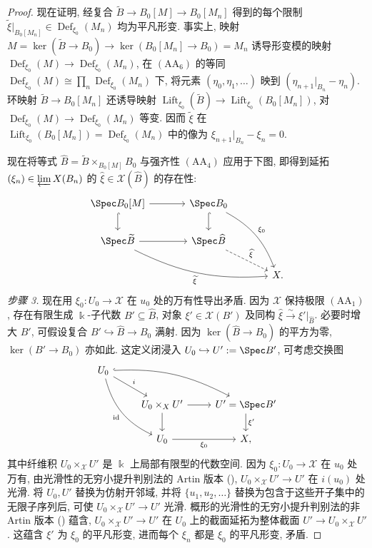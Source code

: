 \begin{proof}
现在证明, 经复合 $\widetilde B\to B_0[M]\to B_0[M_n]$ 得到的每个限制 $\widetilde\xi|_{B_0[M_n]}\in\operatorname{Def}_{\xi_0}(M_n)$ 均为平凡形变. 事实上, 映射 $M=\ker(\widetilde B\to B_0)\to\ker(B_0[M_n]\to B_0)=M_n$ 诱导形变模的映射 $\operatorname{Def}_{\xi_0}(M)\to\operatorname{Def}_{\xi_0}(M_n)$, 在 $(\mathrm{AA}_6)$ 的等同 $\operatorname{Def}_{\xi_0}(M)\cong\prod_n\operatorname{Def}_{\xi_0}(M_n)$ 下, 将元素 $(\eta_0,\eta_1,\ldots)$ 映到 $(\eta_{n+1}|_{B_n}-\eta_n)$. 环映射 $\widetilde B\to B_0[M_n]$ 还诱导映射 $\operatorname{Lift}_{\xi_0}(\widetilde B)\to\operatorname{Lift}_{\xi_0}(B_0[M_n])$, 对 $\operatorname{Def}_{\xi_0}(M)\to\operatorname{Def}_{\xi_0}(M_n)$ 等变. 因而 $\widetilde\xi$ 在 $\operatorname{Lift}_{\xi_0}(B_0[M_n])=\operatorname{Def}_{\xi_0}(M_n)$ 中的像为 $\xi_{n+1}|_{B_n}-\xi_n=0$.

现在将等式 $\widehat B=\widetilde B\times_{B_0[M]}B_0$ 与强齐性 $(\mathrm{AA}_4)$ 应用于下图, 即得到延拓 $(\xi_n)\in\varprojlim\mathcal X(B_n)$ 的 $\widehat\xi\in\mathcal X(\widehat B)$ 的存在性:
\[
\begin{tikzcd}[column sep=large]
\Spec B_0[M]\arrow[r]\arrow[d,hook]&\Spec B_0\arrow[d,hook]\arrow[ddr,bend left=20,"\xi_0"]&\\
\Spec\widetilde B\arrow[r]\arrow[drr,bend right=15,"\widetilde\xi"']&\Spec\widehat B\arrow[dr,dashed,"\widehat\xi"]&\\
&&\mathcal X.
\end{tikzcd}
\]
\textit{步骤 3.} 现在用 $\xi_0:U_0\to\mathcal X$ 在 $u_0$ 处的万有性导出矛盾. 因为 $\mathcal X$ 保持极限 $(\mathrm{AA}_1)$, 存在有限生成 $\Bbbk$-子代数 $B'\subseteq\widehat B$, 对象 $\xi'\in\mathcal X(B')$ 及同构 $\widehat\xi\xrightarrow\sim\xi'|_{\widehat B}$. 必要时增大 $B'$, 可假设复合 $B'\hookrightarrow\widehat B\to B_0$ 满射. 因为 $\ker(\widehat B\to B_0)$ 的平方为零, $\ker(B'\to B_0)$ 亦如此. 这定义闭浸入 $U_0\hookrightarrow U':=\Spec B'$, 可考虑交换图
\[
\begin{tikzcd}
U_0\arrow[dr,"i"]\arrow[drr,hook,bend left=15]\arrow[ddr,bend right=25,"\mathrm{id}"']&&\\
&U_0\times_{\mathcal X}U'\arrow[r]\arrow[d]&U'=\Spec B'\arrow[d,"\xi'"]\\
&U_0\arrow[r,"\xi_0"']&\mathcal X,
\end{tikzcd}
\]
其中纤维积 $U_0\times_{\mathcal X}U'$ 是 $\Bbbk$ 上局部有限型的代数空间. 因为 $\xi_0:U_0\to\mathcal X$ 在 $u_0$ 处万有, 由光滑性的无穷小提升判别法的 Artin 版本 (), $U_0\times_{\mathcal X}U'\to U'$ 在 $i(u_0)$ 处光滑. 将 $U_0,U'$ 替换为仿射开邻域, 并将 $\{u_1,u_2,\ldots\}$ 替换为包含于这些开子集中的无限子序列后, 可使 $U_0\times_{\mathcal X}U'\to U'$ 光滑. 概形的光滑性的无穷小提升判别法的非 Artin 版本 () 蕴含, $U_0\times_{\mathcal X}U'\to U'$ 在 $U_0$ 上的截面延拓为整体截面 $U'\to U_0\times_{\mathcal X}U'$. 这蕴含 $\xi'$ 为 $\xi_0$ 的平凡形变, 进而每个 $\xi_n$ 都是 $\xi_0$ 的平凡形变, 矛盾.


\end{proof}
